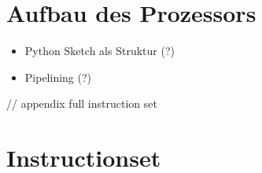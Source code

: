 \documentclass[paper=a4,fontsize=12pt,twocolumn]{scrreprt}
\begin{document}

\section{Aufbau des Prozessors}

\begin{itemize}
    \item Python Sketch als Struktur (?)
    \item Pipelining (?)
\end{itemize}






// appendix full instruction set


\kant[5]


\section{Instructionset}


\end{document}
